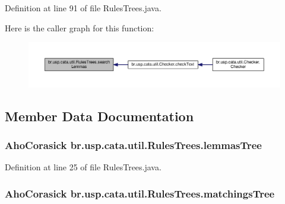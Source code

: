 Definition at line 91 of file Rules\+Trees.\+java.



Here is the caller graph for this function\+:\nopagebreak
\begin{figure}[H]
\begin{center}
\leavevmode
\includegraphics[width=350pt]{classbr_1_1usp_1_1cata_1_1util_1_1_rules_trees_a9bec6cddac112f3a87e1a53e512e9371_icgraph}
\end{center}
\end{figure}




\subsection{Member Data Documentation}
\hypertarget{classbr_1_1usp_1_1cata_1_1util_1_1_rules_trees_a8c396a47e167ded77451bab3aed52684}{
\subsubsection[{lemmas\+Tree}]{\setlength{\rightskip}{0pt plus 5cm}Aho\+Corasick br.\+usp.\+cata.\+util.\+Rules\+Trees.\+lemmas\+Tree\hspace{0.3cm}{\ttfamily [private]}}}\label{classbr_1_1usp_1_1cata_1_1util_1_1_rules_trees_a8c396a47e167ded77451bab3aed52684}


Definition at line 25 of file Rules\+Trees.\+java.

\hypertarget{classbr_1_1usp_1_1cata_1_1util_1_1_rules_trees_a3e326a07d34a8f0fdd58b5901098d534}{
\subsubsection[{matchings\+Tree}]{\setlength{\rightskip}{0pt plus 5cm}Aho\+Corasick br.\+usp.\+cata.\+util.\+Rules\+Trees.\+matchings\+Tree\hspace{0.3cm}{\ttfamily [private]}}}\label{classbr_1_1usp_1_1cata_1_1util_1_1_rules_trees_a3e326a07d34a8f0fdd58b5901098d534}


